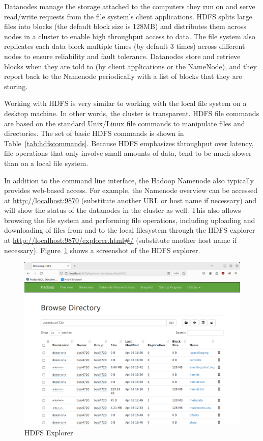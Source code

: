 Datanodes manage the storage attached to the computers they run on and serve read/write requests from the file system's client applications. HDFS splits large files into blocks (the default block size is 128MB) and distributes them across nodes in a cluster to enable high throughput access to data. The file system also replicates each data block multiple times (by default 3 times) across different nodes to ensure reliability and fault tolerance. Datanodes store and retrieve blocks when they are told to (by client applications or the NameNode), and they report back to the Namenode periodically with a list of blocks that they are storing.

Working with HDFS is very similar to working with the local file system on a desktop machine. In other words, the cluster is transparent. HDFS file commands are based on the standard Unix/Linux file commands to manipulate files and directories. The set of basic HDFS commands is shown in Table~\ref{tab:hdfscommands}. Because HDFS emphasizes throughput over latency, file operations that only involve small amounts of data, tend to be much slower than on a local file system.

In addition to the command line interface, the Hadoop Namenode also typically provides web-based access. For example, the Namenode overview can be accessed at \url{http://localhost:9870} (substitute another URL or host name if necessary) and will show the status of the datanodes in the cluster as well. This also allows browsing the file system and performing file operations, including uploading and downloading of files from and to the local filesystem through the HDFS explorer at \url{http://localhost:9870/explorer.html#/} (substitute another host name if necessary). Figure~\ref{fig:hdfswebaccess} shows a screenshot of the HDFS explorer.

\begin{figure}
\centering
\includegraphics[width=.75\textwidth]{hdfs_web_access.png}
\caption{HDFS Explorer}
\label{fig:hdfswebaccess}
\end{figure}

